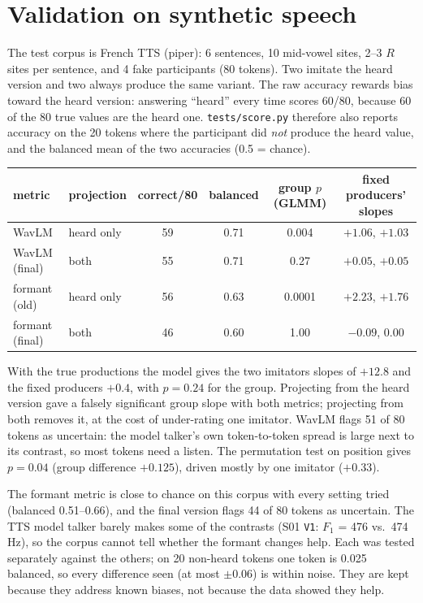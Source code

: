 \documentclass[11pt]{article}
\begin{document}
\section{Validation on synthetic speech}\label{sec:valid}

The test corpus is French TTS (piper): 6 sentences, 10 mid-vowel sites, 2--3 $R$ sites per sentence, and 4 fake participants (80 tokens). Two imitate the heard version and two always produce the same variant. The raw accuracy rewards bias toward the heard version: answering ``heard'' every time scores 60/80, because 60 of the 80 true values are the heard one. \texttt{tests/score.py} therefore also reports accuracy on the 20 tokens where the participant did \emph{not} produce the heard value, and the balanced mean of the two accuracies (0.5 = chance).

\begin{center}\small
\begin{tabular}{llcccc}
\toprule
metric & projection & correct/80 & balanced & group $p$ (GLMM) & fixed producers' slopes \\
\midrule
WavLM & heard only & 59 & 0.71 & 0.004 & $+1.06$, $+1.03$ \\
WavLM (final) & both & 55 & 0.71 & 0.27 & $+0.05$, $+0.05$ \\
formant (old) & heard only & 56 & 0.63 & 0.0001 & $+2.23$, $+1.76$ \\
formant (final) & both & 46 & 0.60 & 1.00 & $-0.09$, $0.00$ \\
\bottomrule
\end{tabular}
\end{center}

With the true productions the model gives the two imitators slopes of $+12.8$ and the fixed producers $+0.4$, with $p = 0.24$ for the group. Projecting from the heard version gave a falsely significant group slope with both metrics; projecting from both removes it, at the cost of under-rating one imitator. WavLM flags 51 of 80 tokens as uncertain: the model talker's own token-to-token spread is large next to its contrast, so most tokens need a listen. The permutation test on position gives $p = 0.04$ (group difference $+0.125$), driven mostly by one imitator ($+0.33$).

The formant metric is close to chance on this corpus with every setting tried (balanced 0.51--0.66), and the final version flags 44 of 80 tokens as uncertain. The TTS model talker barely makes some of the contrasts (S01 \texttt{V1}: $F_1$ = 476 vs.\ 474\,Hz), so the corpus cannot tell whether the formant changes help. Each was tested separately against the others; on 20 non-heard tokens one token is 0.025 balanced, so every difference seen (at most $\pm0.06$) is within noise. They are kept because they address known biases, not because the data showed they help.
\end{document}

